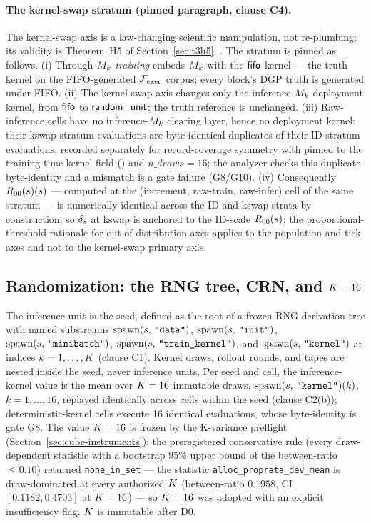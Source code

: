 \paragraph{The kernel-swap stratum (pinned paragraph, clause C4).}
The kernel-swap axis is a law-changing scientific manipulation, not
re-plumbing; its validity is Theorem~H5 of Section~\ref{sec:t3h5}.
. The stratum is pinned as follows.
(i) Through-$M_k$ \emph{training} embeds $M_k$ with the $\mathsf{fifo}$ kernel ---
the truth kernel on the FIFO-generated $\mathcal{F}_{\mathrm{exec}}$ corpus; every block's DGP
truth is generated under FIFO. (ii) The kernel-swap axis changes only the
inference-$M_k$ deployment kernel, from $\mathsf{fifo}$ to $\mathsf{random\_unit}$; the truth reference
is unchanged. (iii) Raw-inference cells have no inference-$M_k$ clearing
layer, hence no deployment kernel: their kswap-stratum evaluations are
byte-identical duplicates of their ID-stratum evaluations, recorded
separately for record-coverage symmetry with  pinned to
the training-time kernel field () and $n\_draws = 16$; the analyzer
checks this duplicate byte-identity and a mismatch is a gate failure (G8/G10).
(iv) Consequently $R_{00}(s)(s)$ --- computed at the (increment, raw-train,
raw-infer) cell of the same stratum --- is numerically identical across the ID
and kswap strata by construction, so $\delta_{s}$ at kswap is anchored to the
ID-scale $R_{00}(s)$; the proportional-threshold rationale for
out-of-distribution axes applies to the population and tick axes and not to
the kernel-swap primary axis.

\subsection{Randomization: the RNG tree, CRN, and \texorpdfstring{$K = 16$}{K = 16}}
\label{sec:cube-rng}

The inference unit is the seed, defined as the root of a frozen RNG
derivation tree with named substreams
$\operatorname{spawn}(s,\,\texttt{"data"})$, $\operatorname{spawn}(s,\,\texttt{"init"})$, $\operatorname{spawn}(s,\,\texttt{"minibatch"})$,
$\operatorname{spawn}(s,\,\texttt{"train\_kernel"})$, and $\operatorname{spawn}(s,\,\texttt{"kernel"})$ at indices
$k = 1,\dots,K$ (clause C1). Kernel draws, rollout rounds, and tapes are
nested inside the seed, never inference units. Per seed and cell, the
inference-kernel value is the mean over $K = 16$ immutable draws,
$\operatorname{spawn}(s,\,\texttt{"kernel"})(k)$, $k = 1,\dots,16$, replayed identically across cells
within the seed (clause C2(b)); deterministic-kernel cells execute 16
identical evaluations, whose byte-identity is gate G8. The value $K = 16$
is frozen by the K-variance preflight (Section~\ref{sec:cube-instruments}):
the preregistered conservative rule (every draw-dependent statistic with a
bootstrap 95\% upper bound of the between-ratio $\le 0.10$) returned
\texttt{none\_in\_set} --- the statistic \texttt{alloc\_proprata\_dev\_mean}
is draw-dominated at every authorized $K$ (between-ratio $0.1958$, CI
$[0.1182, 0.4703]$ at $K = 16$) --- so $K = 16$ was adopted with an
explicit insufficiency flag. $K$ is immutable after D0.

